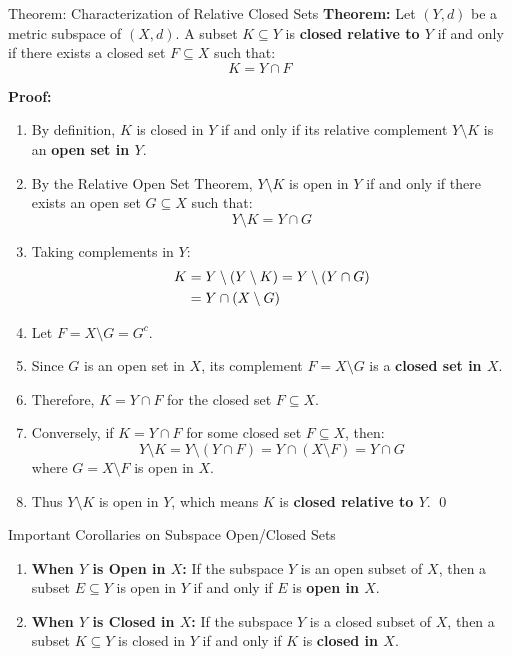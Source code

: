 \documentclass[11pt,a4paper]{article}
\begin{document}
\begin{exbox}{Theorem: Characterization of Relative Closed Sets}
\textbf{Theorem:} Let $(Y, d)$ be a metric subspace of $(X, d)$. A subset $K \subseteq Y$ is \textbf{closed relative to $Y$} if and only if there exists a closed set $F \subseteq X$ such that:
\begin{equation}
    K = Y \cap F
\end{equation}

\textbf{Proof:}
\begin{enumerate}
    \item By definition, $K$ is closed in $Y$ if and only if its relative complement $Y \setminus K$ is an \textbf{open set in $Y$}.
    \item By the Relative Open Set Theorem, $Y \setminus K$ is open in $Y$ if and only if there exists an open set $G \subseteq X$ such that:
    \begin{equation}
        Y \setminus K = Y \cap G
    \end{equation}
    \item Taking complements in $Y$:
    \begin{align}
        K &= Y \setminus (Y \setminus K) = Y \setminus (Y \cap G) \notag \\
        &= Y \cap (X \setminus G)
    \end{align}
    \item Let $F = X \setminus G = G^c$.
    \item Since $G$ is an open set in $X$, its complement $F = X \setminus G$ is a \textbf{closed set in $X$}.
    \item Therefore, $K = Y \cap F$ for the closed set $F \subseteq X$.
    \item Conversely, if $K = Y \cap F$ for some closed set $F \subseteq X$, then:
    \begin{equation}
        Y \setminus K = Y \setminus (Y \cap F) = Y \cap (X \setminus F) = Y \cap G
    \end{equation}
    where $G = X \setminus F$ is open in $X$.
    \item Thus $Y \setminus K$ is open in $Y$, which means $K$ is \textbf{closed relative to $Y$}. \qed
\end{enumerate}
\end{exbox}

\begin{formulabox}{Important Corollaries on Subspace Open/Closed Sets}
\begin{enumerate}
    \item \textbf{When $Y$ is Open in $X$:}
    If the subspace $Y$ is an open subset of $X$, then a subset $E \subseteq Y$ is open in $Y$ if and only if $E$ is \textbf{open in $X$}.
    \item \textbf{When $Y$ is Closed in $X$:}
    If the subspace $Y$ is a closed subset of $X$, then a subset $K \subseteq Y$ is closed in $Y$ if and only if $K$ is \textbf{closed in $X$}.
\end{enumerate}
\end{formulabox}
\end{document}
